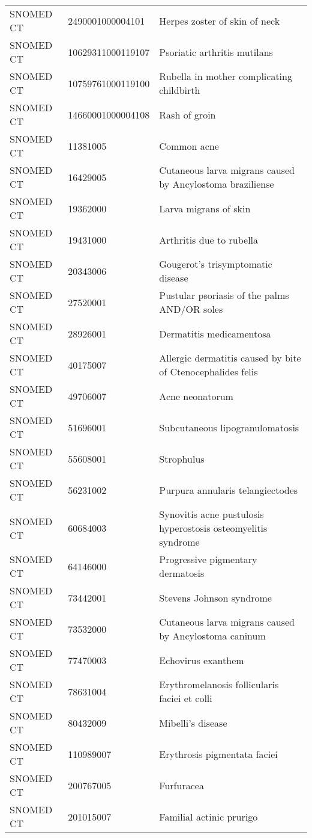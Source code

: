 \begin{longtable}{p{}p{}p{}}
  SNOMED CT & 2490001000004101 & Herpes zoster of skin of neck \\ 
  SNOMED CT & 10629311000119107 & Psoriatic arthritis mutilans \\ 
  SNOMED CT & 10759761000119100 & Rubella in mother complicating childbirth \\ 
  SNOMED CT & 14660001000004108 & Rash of groin \\ 
  SNOMED CT & 11381005 & Common acne \\ 
  SNOMED CT & 16429005 & Cutaneous larva migrans caused by Ancylostoma braziliense \\ 
  SNOMED CT & 19362000 & Larva migrans of skin \\ 
  SNOMED CT & 19431000 & Arthritis due to rubella \\ 
  SNOMED CT & 20343006 & Gougerot's trisymptomatic disease \\ 
  SNOMED CT & 27520001 & Pustular psoriasis of the palms AND/OR soles \\ 
  SNOMED CT & 28926001 & Dermatitis medicamentosa \\ 
  SNOMED CT & 40175007 & Allergic dermatitis caused by bite of Ctenocephalides felis \\ 
  SNOMED CT & 49706007 & Acne neonatorum \\ 
  SNOMED CT & 51696001 & Subcutaneous lipogranulomatosis \\ 
  SNOMED CT & 55608001 & Strophulus \\ 
  SNOMED CT & 56231002 & Purpura annularis telangiectodes \\ 
  SNOMED CT & 60684003 & Synovitis acne pustulosis hyperostosis osteomyelitis syndrome \\ 
  SNOMED CT & 64146000 & Progressive pigmentary dermatosis \\ 
  SNOMED CT & 73442001 & Stevens Johnson syndrome \\ 
  SNOMED CT & 73532000 & Cutaneous larva migrans caused by Ancylostoma caninum \\ 
  SNOMED CT & 77470003 & Echovirus exanthem \\ 
  SNOMED CT & 78631004 & Erythromelanosis follicularis faciei et colli \\ 
  SNOMED CT & 80432009 & Mibelli's disease \\ 
  SNOMED CT & 110989007 & Erythrosis pigmentata faciei \\ 
  SNOMED CT & 200767005 & Furfuracea \\ 
  SNOMED CT & 201015007 & Familial actinic prurigo \\ 

\end{longtable}
